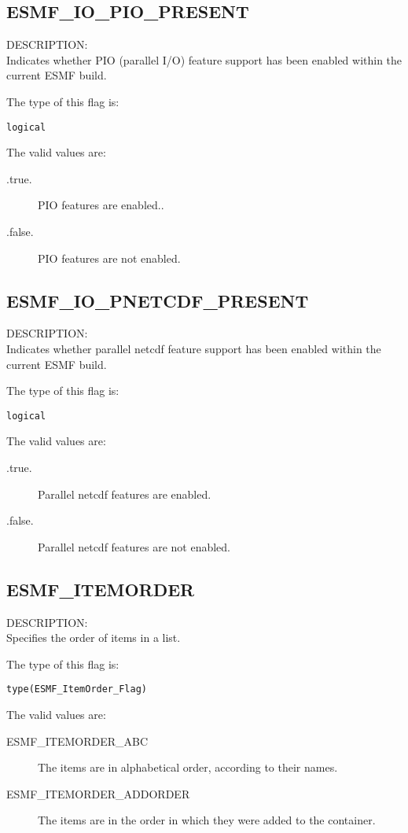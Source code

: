 \subsection{ESMF\_IO\_PIO\_PRESENT}
\label{const:iopioflag}
{\sf DESCRIPTION:\\}
Indicates whether PIO (parallel I/O) feature support has been enabled
within the current ESMF build.

The type of this flag is:

{\tt logical}

The valid values are:
\begin{description}
 \item [.true.]
      PIO features are enabled..
\item [.false.]
      PIO  features are not enabled.
\end{description}

\subsection{ESMF\_IO\_PNETCDF\_PRESENT}
\label{const:iopnetcdfflag}
{\sf DESCRIPTION:\\}
Indicates whether parallel netcdf feature support has been enabled
within the current ESMF build.

The type of this flag is:

{\tt logical}

The valid values are:
\begin{description}
\item [.true.]
      Parallel netcdf features are enabled.
\item [.false.]
      Parallel netcdf features are not enabled.
\end{description}


\subsection{ESMF\_ITEMORDER}
\label{const:itemorderflag}
{\sf DESCRIPTION:\\}  
Specifies the order of items in a list.

The type of this flag is:

{\tt type(ESMF\_ItemOrder\_Flag)}

The valid values are:
\begin{description}

\item [ESMF\_ITEMORDER\_ABC]
         The items are in alphabetical order, according to their names.
\item [ESMF\_ITEMORDER\_ADDORDER]
         The items are in the order in which they were added to the container.
\end{description}


